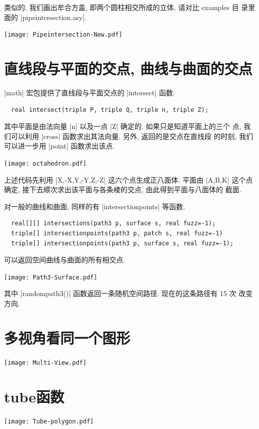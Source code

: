 \documentclass[nofonts,CJKnormalspaces]{ctexbook}
\begin{document}
类似的, 我们画出牟合方盖, 即两个圆柱相交所成的立体, 请对比 examples 目
录里面的 |pipeintersection.asy|.
\begin{center}\texttt{[image: Pipeintersection-New.pdf]}\end{center}%


\section{直线段与平面的交点, 曲线与曲面的交点}
|math| 宏包提供了直线段与平面交点的 |intersect| 函数.
\begin{lstlisting}
  real intersect(triple P, triple Q, triple n, triple Z);
\end{lstlisting}
其中平面是由法向量 |n| 以及一点 |Z| 确定的. 如果只是知道平面上的三个
点, 我们可以利用 |cross| 函数求出其法向量. 另外, 返回的是交点在直线段
的时刻, 我们可以进一步用 |point| 函数求出该点.

\begin{center}\texttt{[image: octahedron.pdf]}\end{center}%

上述代码先利用 |X,-X,Y,-Y,Z,-Z| 这六个点生成正八面体. 平面由 |A,B,K|
这个点确定, 接下去顺次求出该平面与各条棱的交点, 由此得到平面与八面体的
截面.

对一般的曲线和曲面, 同样的有 |intersectionpoints| 等函数.
\begin{lstlisting}
  real[][] intersections(path3 p, surface s, real fuzz=-1);
  triple[] intersectionpoints(path3 p, patch s, real fuzz=-1)
  triple[] intersectionpoints(path3 p, surface s, real fuzz=-1);
\end{lstlisting}
可以返回空间曲线与曲面的所有相交点.
\begin{center}\texttt{[image: Path3-Surface.pdf]}\end{center}%

其中 |randompath3()| 函数返回一条随机空间路径. 现在的这条路径有 15 次
改变方向.

\section{多视角看同一个图形}
\begin{center}\texttt{[image: Multi-View.pdf]}\end{center}%


\section{tube函数}
\begin{center}\texttt{[image: Tube-polygon.pdf]}\end{center}%

\end{document}
